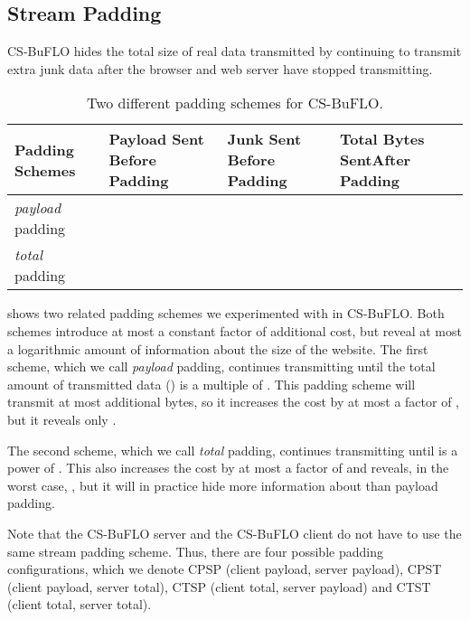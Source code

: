 \documentclass[10pt,journal]{IEEEtran}
\newcommand{\csb} {CS-BuFLO\xspace}
\begin{document}
\subsection{Stream Padding}
\label{ssec:stream-padding}

\csb hides the total size of real data transmitted by continuing to
transmit extra junk data after the browser and web server have stopped
transmitting.

\begin{table}[t]
  \small
  \centering
  \bgroup
  \def\arraystretch{1.5}
  \begin{tabular}{|p{1.1cm}|p{2cm}|p{2cm}|p{2.2cm}|}\hline
    Padding Schemes      		&	Payload Sent \newline Before Padding	& Junk Sent	\newline Before Padding		&	Total Bytes Sent\newline After Padding \\
    \hline
    \hline
    \textit{payload} padding	&					&				&			\\
	\hline    
    \textit{total} padding		&					&				& 			\\
    \hline
  \end{tabular}
  \egroup
  \caption{Two different padding schemes for \csb.}
  \label{tab:padding-schemes}
\end{table}


 shows two related padding schemes we experimented with in \csb.  Both
schemes introduce at most a constant factor of additional cost,
but reveal at most a logarithmic amount of information about the size
of the website.  The first scheme, which we call \textit{payload}
padding, continues transmitting until the total amount of transmitted
data () is a multiple of .  This
padding scheme will transmit at most 
additional bytes, so it increases the cost by at most a factor of
, but it reveals only .

The second scheme, which we call \textit{total} padding, continues
transmitting until  is a power of .  This also increases the
cost by at most a factor of  and reveals, in the worst case,
, but it will in practice hide more information about 
than payload padding.

Note that the \csb server and the \csb client do not have to use the
same stream padding scheme.  Thus, there are four possible padding
configurations, which we denote CPSP (client payload, server payload),
CPST (client payload, server total), CTSP (client total, server
payload) and CTST (client total, server total).
\end{document}
